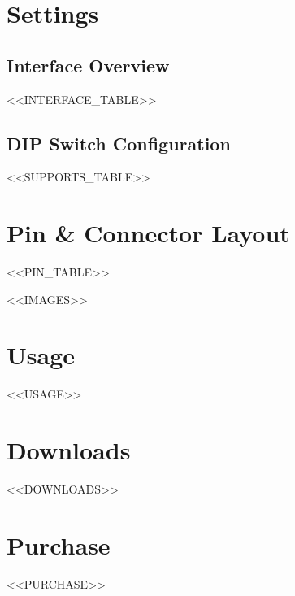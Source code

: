\documentclass[10pt]{article}
\begin{document}
\vspace{1em}



\section*{Settings}

\subsection*{Interface Overview}
<<INTERFACE_TABLE>>

\subsection*{DIP Switch Configuration}
<<SUPPORTS_TABLE>>



\section*{Pin \& Connector Layout}
<<PIN_TABLE>>

\FloatBarrier
<<IMAGES>>


\section*{Usage}
<<USAGE>>

\section*{Downloads}

<<DOWNLOADS>>


\section*{Purchase}
<<PURCHASE>>
\end{document}
